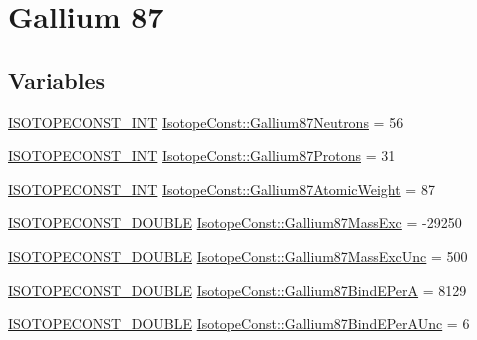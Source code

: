 \hypertarget{group___isotope_const-_gallium-_ga87}{}\section{Gallium 87}
\label{group___isotope_const-_gallium-_ga87}
\subsection*{Variables}
\begin{DoxyCompactItemize}
\item 
\mbox{\hyperlink{group___isotope_const-_macros_ga5f18360b3e99483a35c32d789e62621c}{I\+S\+O\+T\+O\+P\+E\+C\+O\+N\+S\+T\+\_\+\+I\+NT}} \mbox{\hyperlink{group___isotope_const-_gallium-_ga87_gabce70999163f201a3e90c5a23e194b09}{Isotope\+Const\+::\+Gallium87\+Neutrons}} = 56
\item 
\mbox{\hyperlink{group___isotope_const-_macros_ga5f18360b3e99483a35c32d789e62621c}{I\+S\+O\+T\+O\+P\+E\+C\+O\+N\+S\+T\+\_\+\+I\+NT}} \mbox{\hyperlink{group___isotope_const-_gallium-_ga87_gaaf0847382e3f75fee5b80b2f173c9676}{Isotope\+Const\+::\+Gallium87\+Protons}} = 31
\item 
\mbox{\hyperlink{group___isotope_const-_macros_ga5f18360b3e99483a35c32d789e62621c}{I\+S\+O\+T\+O\+P\+E\+C\+O\+N\+S\+T\+\_\+\+I\+NT}} \mbox{\hyperlink{group___isotope_const-_gallium-_ga87_ga27f9b071cab3fd396da7503c27ed5ac6}{Isotope\+Const\+::\+Gallium87\+Atomic\+Weight}} = 87
\item 
\mbox{\hyperlink{group___isotope_const-_macros_ga8f45a7272ce02c0b4c65c44636ed719a}{I\+S\+O\+T\+O\+P\+E\+C\+O\+N\+S\+T\+\_\+\+D\+O\+U\+B\+LE}} \mbox{\hyperlink{group___isotope_const-_gallium-_ga87_ga7c5a1e267d44c91fe45fcb39e722a3af}{Isotope\+Const\+::\+Gallium87\+Mass\+Exc}} = -\/29250
\item 
\mbox{\hyperlink{group___isotope_const-_macros_ga8f45a7272ce02c0b4c65c44636ed719a}{I\+S\+O\+T\+O\+P\+E\+C\+O\+N\+S\+T\+\_\+\+D\+O\+U\+B\+LE}} \mbox{\hyperlink{group___isotope_const-_gallium-_ga87_ga4eb879cc60924de00c603a9b35c7e159}{Isotope\+Const\+::\+Gallium87\+Mass\+Exc\+Unc}} = 500
\item 
\mbox{\hyperlink{group___isotope_const-_macros_ga8f45a7272ce02c0b4c65c44636ed719a}{I\+S\+O\+T\+O\+P\+E\+C\+O\+N\+S\+T\+\_\+\+D\+O\+U\+B\+LE}} \mbox{\hyperlink{group___isotope_const-_gallium-_ga87_ga97e1442b23cd22e52e8faa905b24868b}{Isotope\+Const\+::\+Gallium87\+Bind\+E\+PerA}} = 8129
\item 
\mbox{\hyperlink{group___isotope_const-_macros_ga8f45a7272ce02c0b4c65c44636ed719a}{I\+S\+O\+T\+O\+P\+E\+C\+O\+N\+S\+T\+\_\+\+D\+O\+U\+B\+LE}} \mbox{\hyperlink{group___isotope_const-_gallium-_ga87_gad68cd64a57efc08bd9429b8644ab90fb}{Isotope\+Const\+::\+Gallium87\+Bind\+E\+Per\+A\+Unc}} = 6

\end{DoxyCompactItemize}
